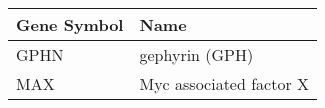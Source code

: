 \begin{tabular}{ll}
\toprule
Gene Symbol &                    Name \\
\midrule
       GPHN &          gephyrin (GPH) \\
        MAX & Myc associated factor X \\
\bottomrule
\end{tabular}
